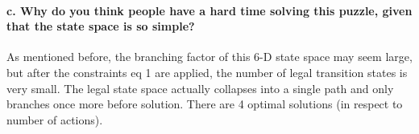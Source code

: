 \documentclass[12pt]{article}
\begin{document}
\paragraph{c. Why do you think people have a hard time solving this puzzle, given that the state space
is so simple?}
As mentioned before, the branching factor of this 6-D state space may seem large, but after the constraints eq 1 are applied, the number of legal transition states is very small. The legal state space actually collapses into a single path and only branches once more before solution. There are 4 optimal solutions (in respect to number of actions). 
\end{document}
